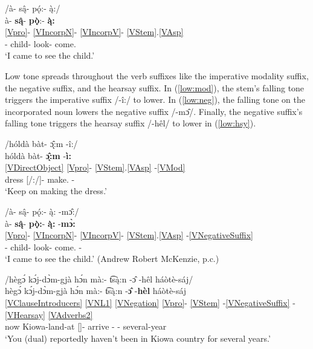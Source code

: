 \documentclass[output=paper]{langscibook}
\begin{document}
\ea \label{low:incorp}
\gllll /\`a- s\k{â}- p\k{ó}:- \k{\`a}:/\\
\`a- \textbf{s\k{â}}- \textbf{p\k{ò}}:- \textbf{\k{\`a}:}\\
{\ref{Vpro}}- \ref{VIncorpN}- \ref{VIncorpV}- \ref{VStem}.\ref{VAsp}\\
[\First\Sg]- child- look- come.\Pfv\\
\trans `I came to see the child.' \citep[][92]{Miller:2018} %
\z 

Low tone spreads throughout the verb suffixes like the imperative modality suffix, the negative suffix, and the hearsay suffix. In (\ref{low:mod}), the stem's falling tone triggers the imperative suffix /-î:/ to lower. In (\ref{low:neg}), the falling tone on the incorporated noun lowers the negative suffix /-m\^{ɔ}/. Finally, the negative suffix's falling tone triggers the hearsay suffix /-hêl/ to lower in (\ref{low:hsy}).

\ea \label{low:mod}
\gllll /hóld\`a b\`at- \k{\^{ɔ}}:m -î:/ \\
hóld\`a b\`at- \textbf{\k{\^{ɔ}}:m} -\textbf{\`i:} \\
\ref{VDirectObject} {\ref{Vpro}}- \ref{VStem}.\ref{VAsp} -\ref{VMod}\\
dress [\Second\Sg/\Aarg:\Pl/\Obj]- make.{\Ipfv} -{\Imp}\\
\trans `Keep on making the dress.' \citep[adapted from][92]{Miller:2018} %
\z 

\ea \label{low:neg}
\gllll /\`a- s\k{â}- p\k{ó}:- \k{\`a}: -m\^{ɔ}:/ \\
\`a- \textbf{s\k{â}}- \textbf{p\k{ò}:}- \textbf{\k{\`a}:} -\textbf{m\`{ɔ}:}\\
{\ref{Vpro}}- \ref{VIncorpN}- \ref{VIncorpV}- \ref{VStem}.\ref{VAsp} -\ref{VNegativeSuffix}\\
[\First\Sg]- child- look- come.{\Pfv} -{\Neg}\\
\trans `I came to see the child.' (Andrew Robert McKenzie, p.c.)
\z 

\ea \label{low:hsy}
\gllll /hèg\'{ɔ} k\'{ɔ}j-d\`{ɔ}m-gj\`a h\'{ɔ}n m\`a:- t͡s\k{\`a}:n -\^{ɔ} -hêl háòtè-sáj/ \\
hèg\'{ɔ} k\'{ɔ}j-d\`{ɔ}m-gj\`a h\'{ɔ}n m\`a:- t͡s\k{\`a}:n -\textbf{\^{ɔ}} -\textbf{hèl} háòtè-sáj\\
\ref{VClauseIntroducers} \ref{VNL1} \ref{VNegation} {\ref{Vpro}}- \ref{VStem} -\ref{VNegativeSuffix} -\ref{VHearsay} \ref{VAdverbs2}\\
now Kiowa-land-at {\Neg} [\Second\Du]- arrive -{\Neg} -{\Hsy} several-year\\
\trans `You (dual) reportedly haven't been in Kiowa country for several years.' \citep[][178]{Watkins:1984}
\z 
\end{document}
